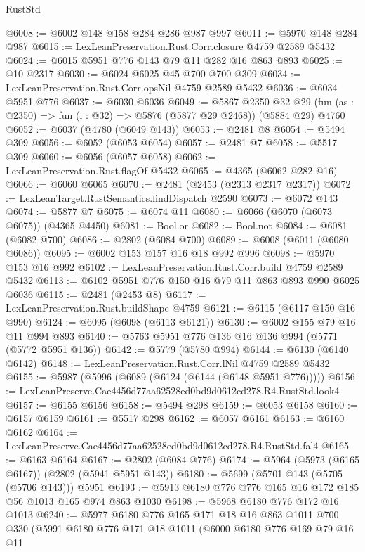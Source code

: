 \begin{lexlean}{RustStd}
\begin{coremodule}
@6008 := @6002 @148 @158 @284 @286 @987 @997
@6011 := @5970 @148 @284 @987
@6015 := LexLeanPreservation.Rust.Corr.closure @4759 @2589 @5432
@6024 := @6015 @5951 @776 @143 @79 @11 @282 @16 @863 @893
@6025 := @10 @2317
@6030 := @6024 @6025 @45 @700 @700 @309
@6034 := LexLeanPreservation.Rust.Corr.opsNil @4759 @2589 @5432
@6036 := @6034 @5951 @776
@6037 := @6030 @6036
@6049 := @5867
    @2350
    @32
    @29
    (fun (as : @2350) => fun (i : @32) => @5876 (@5877 @29 @2468))
    (@5884 @29)
    @4760
@6052 := @6037 (@4780 (@6049 @143))
@6053 := @2481 @8
@6054 := @5494 @309
@6056 := @6052 (@6053 @6054)
@6057 := @2481 @7
@6058 := @5517 @309
@6060 := @6056 (@6057 @6058)
@6062 := LexLeanPreservation.Rust.flagOf @5432
@6065 := @4365 (@6062 @282 @16)
@6066 := @6060 @6065
@6070 := @2481 (@2453 (@2313 @2317 @2317))
@6072 := LexLeanTarget.RustSemantics.findDispatch @2590
@6073 := @6072 @143
@6074 := @5877 @7
@6075 := @6074 @11
@6080 := @6066 (@6070 (@6073 @6075)) (@4365 @4450)
@6081 := Bool.or
@6082 := Bool.not
@6084 := @6081 (@6082 @700)
@6086 := @2802 (@6084 @700)
@6089 := @6008 (@6011 (@6080 @6086))
@6095 := @6002 @153 @157 @16 @18 @992 @996
@6098 := @5970 @153 @16 @992
@6102 := LexLeanPreservation.Rust.Corr.build @4759 @2589 @5432
@6113 := @6102 @5951 @776 @150 @16 @79 @11 @863 @893 @990 @6025 @6036
@6115 := @2481 (@2453 @8)
@6117 := LexLeanPreservation.Rust.buildShape @4759
@6121 := @6115 (@6117 @150 @16 @990)
@6124 := @6095 (@6098 (@6113 @6121))
@6130 := @6002 @155 @79 @16 @11 @994 @893
@6140 := @5763 @5951 @776 @136 @16 @136 @994 (@5771 (@5772 @5951 @136))
@6142 := @5779 (@5780 @994)
@6144 := @6130 (@6140 @6142)
@6148 := LexLeanPreservation.Rust.Corr.lNil @4759 @2589 @5432
@6155 := @5987 (@5996 (@6089 (@6124 (@6144 (@6148 @5951 @776)))))
@6156 := LexLeanPreserve.Cae4456d77aa62528ed0bd9d0612cd278.R4.RustStd.look4
@6157 := @6155 @6156
@6158 := @5494 @298
@6159 := @6053 @6158
@6160 := @6157 @6159
@6161 := @5517 @298
@6162 := @6057 @6161
@6163 := @6160 @6162
@6164 := LexLeanPreserve.Cae4456d77aa62528ed0bd9d0612cd278.R4.RustStd.fal4
@6165 := @6163 @6164
@6167 := @2802 (@6084 @776)
@6174 := @5964 (@5973 (@6165 @6167)) (@2802 (@5941 @5951 @143))
@6180 := @5699 (@5701 @143 (@5705 (@5706 @143))) @5951
@6193 := @5913 @6180 @776 @776 @165 @16 @172 @185 @56 @1013 @165 @974 @863 @1030
@6198 := @5968 @6180 @776 @172 @16 @1013
@6240 := @5977
    @6180
    @776
    @165
    @171
    @18
    @16
    @863
    @1011
    @700
    @330
    (@5991
      @6180
      @776
      @171
      @18
      @1011
      (@6000
        @6180
        @776
        @169
        @79
        @16
        @11

\end{coremodule}
\end{lexlean}
